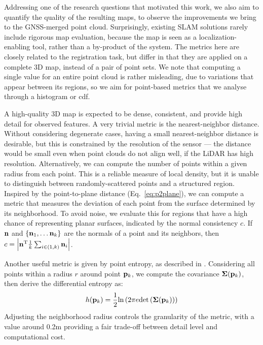 Addressing one of the research questions that motivated this work, we also aim to quantify the quality of the resulting maps, to observe the improvements we bring to the GNSS-merged point cloud. Surprisingly, existing SLAM solutions rarely include rigorous map evaluation, because the map is seen as a localization-enabling tool, rather than a by-product of the system.
The metrics here are closely related to the registration task, but differ in that they are applied on a complete 3D map, instead of a pair of point sets. We note that computing a single value for an entire point cloud is rather misleading, due to variations that appear between its regions, so we aim for point-based metrics that we analyse through a histogram or \acrfull{cdf}.

A high-quality 3D map is expected to be dense, consistent, and provide high detail for observed features. A very trivial metric is the nearest-neighbor distance. Without considering degenerate cases, having a small nearest-neighbor distance is desirable, but this is constrained by the resolution of the sensor --- the distance would be small even when point clouds do not align well, if the LiDAR has high resolution.
Alternatively, we can compute the number of points within a given radius from each point. This is a reliable measure of local density, but it is unable to distinguish between randomly-scattered points and a structured region.
Inspired by the point-to-plane distance (Eq.~\ref{eq:p2plane}), we can compute a metric that measures the deviation of each point from the surface determined by its neighborhood. To avoid noise, we evaluate this for regions that have a high chance of representing planar surfaces, indicated by the normal consistency $c$.
If $\mathbf{n}$ and \mbox{$\left\{\mathbf{n}_1, \dots \mathbf{n}_k\right\}$} are the normals of a point and its neighbors, then
\mbox{$c = \left|{{\mathbf{n}}^\text{T} \frac{1}{k}\sum_{i \in (1, k)} \mathbf{n}_i}\right|$}.

\newcommand{\pk}{\vecx{p}_k}
Another useful metric is given by point entropy, as described in \cite{adolfsson2021coral}. Considering all points within a radius $r$ around point $\pk$, we compute the covariance $\matx{\Sigma}(\pk)$, then derive the differential entropy as:
\begin{equation}
    h(\pk) = \frac{1}{2}\text{ln}\left(
    2\pi e \text{det}\left(\matx{\Sigma}(\pk)\right)
    \right)
\end{equation}
Adjusting the neighborhood radius controls the granularity of the metric, with a value around 0.2m providing a fair trade-off between detail level and computational cost.

